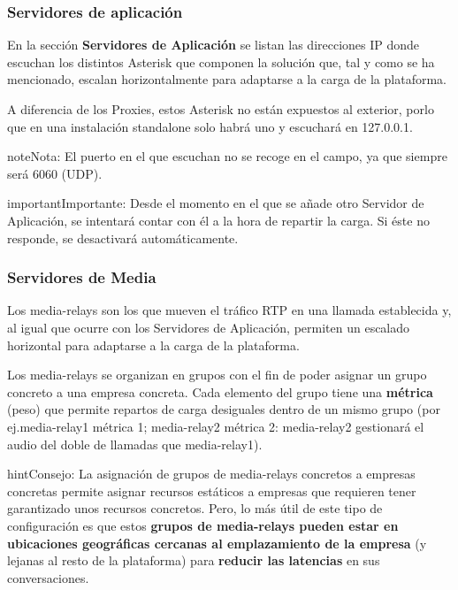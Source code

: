 \documentclass[letterpaper,10pt,spanish]{sphinxmanual}
\begin{document}
\subsubsection{Servidores de aplicación}
\label{internal_calls/god_portal:application-servers}
En la sección \textbf{Servidores de Aplicación} se listan las direcciones IP donde escuchan los distintos Asterisk que componen la solución que, tal y como se ha mencionado, escalan horizontalmente para adaptarse a la carga de la plataforma.

A diferencia de los Proxies, estos Asterisk no están expuestos al exterior, porlo que en una instalación standalone solo habrá uno y escuchará en 127.0.0.1.

\noindent{}

\begin{notice}{note}{Nota:}
El puerto en el que escuchan no se recoge en el campo, ya que siempre será 6060 (UDP).
\end{notice}

\begin{notice}{important}{Importante:}
Desde el momento en el que se añade otro Servidor de Aplicación, se intentará contar con él a la hora de repartir la carga. Si éste no responde, se desactivará automáticamente.
\end{notice}


\subsubsection{Servidores de Media}
\label{internal_calls/god_portal:media-relay}
Los media-relays son los que mueven el tráfico RTP en una llamada establecida y, al igual que ocurre con los Servidores de Aplicación, permiten un escalado horizontal para adaptarse a la carga de la plataforma.

Los media-relays se organizan en grupos con el fin de poder asignar un grupo concreto a una empresa concreta. Cada elemento del grupo tiene una \textbf{métrica} (peso) que permite repartos de carga desiguales dentro de un mismo grupo (por ej.media-relay1 métrica 1; media-relay2 métrica 2: media-relay2 gestionará el audio del doble de llamadas que media-relay1).

\begin{notice}{hint}{Consejo:}
La asignación de grupos de media-relays concretos a empresas concretas permite asignar recursos estáticos a empresas que requieren tener garantizado unos recursos concretos. Pero, lo más útil de este tipo de configuración es que estos \textbf{grupos de media-relays pueden estar en ubicaciones geográficas cercanas al emplazamiento de la empresa} (y lejanas al resto de la plataforma) para \textbf{reducir las latencias} en sus conversaciones.
\end{notice}
\end{document}
